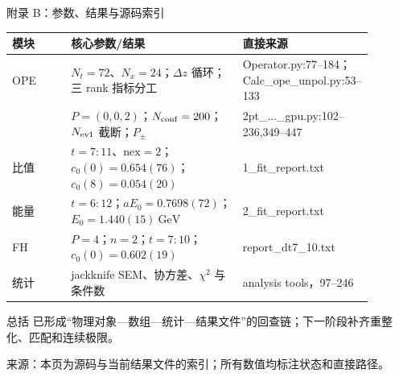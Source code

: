 \documentclass[UTF8,aspectratio=169,11pt]{ctexbeamer}
\newcommand{\source}[1]{%
  \vspace{0.08em}\par{\raggedright\scriptsize\color{muted}来源：#1\par}}
\begin{document}
\begin{frame}[t]{附录 B：参数、结果与源码索引}
  \small
  \begin{tabularx}{0.96\textwidth}{@{}>{\raggedright\arraybackslash}p{0.17\linewidth}>{\raggedright\arraybackslash}p{0.49\linewidth}>{\raggedright\arraybackslash\footnotesize}p{0.23\linewidth}@{}}
    \toprule
    模块 & 核心参数/结果 & 直接来源 \\
    \midrule
    OPE & $N_t=72$、$N_x=24$；$\Delta z$ 循环；三 rank 指标分工 & Operator.py:77--184；Calc\_ope\_unpol.py:53--133 \\
    2pt & $P=(0,0,2)$；$N_{\rm conf}=200$；$N_{\rm ev1}$ 截断；$P_\pm$ & 2pt\_...\_gpu.py:102--236,349--447 \\
    比值 & $t=7\!:\!11$、$\mathrm{nex}=2$；$c_0(0)=0.654(76)$；$c_0(8)=0.054(20)$ & 1\_fit\_report.txt \\
    能量 & $t=6\!:\!12$；$aE_0=0.7698(72)$；$E_0=1.440(15)\ \mathrm{GeV}$ & 2\_fit\_report.txt \\
    FH & $P=4$；$n=2$；$t=7\!:\!10$；$c_0(0)=0.602(19)$ & report\_dt7\_10.txt \\
    统计 & jackknife SEM、协方差、$\chi^2$ 与条件数 & analysis tools，97--246 \\
    \bottomrule
  \end{tabularx}
  \vspace{0.25em}
  \begin{block}{总括}
    已形成“物理对象—数组—统计—结果文件”的回查链；下一阶段补齐重整化、匹配和连续极限。
  \end{block}
  \source{本页为源码与当前结果文件的索引；所有数值均标注状态和直接路径。}
\end{frame}
\end{document}
